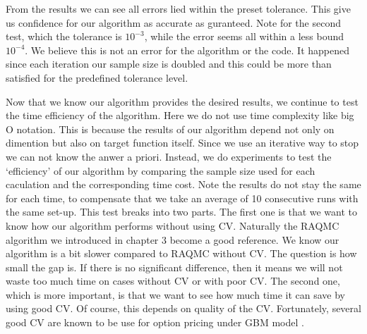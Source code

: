 From the results we can see all errors lied within the preset tolerance. 
This give us confidence for our algorithm as accurate as guranteed. 
Note for the second test, which the tolerance is $10^{-3}$, while the error seems all within a less bound $10^{-4}$. 
We believe this is not an error for the algorithm or the code.  
It happened since each iteration our sample size is doubled and this could be more than satisfied for the predefined tolerance level.


Now that we know our algorithm provides the desired results, we continue to test the time efficiency of the algorithm. 
Here we do not use time complexity like big O notation. This is because the results of our algorithm depend not only on dimention but also on target function itself. Since we use an iterative way to stop we can not know the anwer a priori. 
Instead, we do experiments to test the `efficiency' of our algorithm by comparing the sample size used for each caculation and the corresponding time cost. 
Note the results do not stay the same for each time, to compensate that we take an average of 10 consecutive runs with the same set-up. 
This test breaks into two parts. 
The first one is that we want to know how our algorithm performs without using CV. 
Naturally the RAQMC algorithm we introduced in chapter 3 become a good reference. 
We know our algorithm is a bit slower compared to RAQMC without CV. The question is how small the gap is. 
If there is no significant difference, then it means we will not waste too much time on cases without CV or with poor CV. 
The second one, which is more important, is that we want to see how much time it can save by using good CV. Of course, this depends on quality of the CV. Fortunately, several good CV are known to be use for option pricing under GBM model \cite{lidebrandt2007variance}.         

